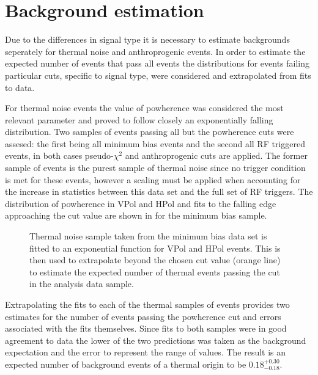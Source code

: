 \section{Background estimation}
\label{sec:Analysis:Background-Estimation}

Due to the differences in signal type it is necessary to estimate backgrounds seperately for thermal noise and anthroprogenic events. In order to estimate the expected number of events that pass all events the distributions for events failing particular cuts, specific to signal type, were considered and extrapolated from fits to data.

For thermal noise events the value of powherence was considered the most relevant parameter and proved to follow closely an exponentially falling distribution. Two samples of events passing all but the powherence cuts were assesed: the first being all minimum bias events and the second all RF triggered events, in both cases pseudo-$\chi^{2}$ and anthroprogenic cuts are applied. The former sample of events is the purest sample of thermal noise since no trigger condition is met for these events, however a scaling must be applied when accounting for the increase in statistics between this data set and the full set of RF triggers. The distribution of powherence in VPol and HPol and fits to the falling edge approaching the cut value are shown in  for the minimum bias sample. 

\begin{figure}[htpb]
\hfill
{}
\caption{Thermal noise sample taken from the minimum bias data set is fitted to an exponential function for VPol and HPol events. This is then used to extrapolate beyond the chosen cut value (orange line) to estimate the expected number of thermal events passing the cut in the analysis data sample.}
\label{fig:Analysis:Background-Estimation:Thermal-Background}
\end{figure}

Extrapolating the fits to each of the thermal samples of events provides two estimates for the number of events passing the powherence cut and errors associated with the fits themselves. Since fits to both samples were in good agreement to data the lower of the two predictions was taken as the background expectation and the error to represent the range of values. The result is an expected number of background events of a thermal origin to be $0.18^{+0.30}_{-0.18}$.

